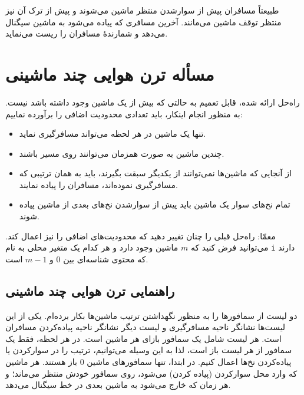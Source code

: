 \documentclass{book}
\newcommand{\clearemptydoublepage}{\newpage\cleardoublepage}
\begin{document}
    طبیعتاً مسافران پیش از سوارشدن منتظر ماشین می‌شوند و پیش از ترک آن نیز منتظر توقف ماشین می‌مانند. 
    آخرین مسافری که پیاده می‌شود به ماشین سیگنال می‌دهد و شمارندهٔ مسافران را ریست می‌نماید. 


\clearemptydoublepage
\section{مسأله ترن هوایی چند ماشینی}

    راه‌حل ارائه شده، قابل تعمیم به حالتی که بیش از یک ماشین وجود داشته باشد نیست. به منظور انجام اینکار، باید تعدادی محدودیت اضافی را برآورده نماییم:

\begin{itemize}

\item 
    تنها یک ماشین در هر لحظه می‌تواند مسافرگیری نماید.

\item 
    چندین ماشین به صورت همزمان می‌توانند روی مسیر باشند. 

\item 
    از آنجایی که ماشین‌ها نمی‌توانند از یکدیگر سبقت بگیرند، باید به همان ترتیبی که مسافرگیری نموده‌اند، مسافران را پیاده نمایند. 

\item 
    تمام نخ‌های سوار یک ماشین باید پیش از سوارشدن نخ‌های بعدی از ماشین پیاده شوند.
\end{itemize}

    معمّا: راه‌حل قبلی را چنان تغییر دهید که محدودیت‌های اضافی را نیز اعمال کند. 
    می‌توانید فرض کنید که  $m$ ماشین وجود دارد و هر کدام یک متغیر محلی به نام {\tt i} دارند که محتوی شناسه‌‌ای بین 0 و  $m-1$ است. 


\clearemptydoublepage
\subsection{راهنمایی ترن هوایی چند ماشینی}

    دو لیست از سمافورها را به منظور نگهداشتن ترتیب ماشین‌ها بکار برده‌ام. یکی از این لیست‌ها نشانگر ناحیه مسافرگیری و لیست دیگر 
    نشانگر ناحیه پیاده‌کردن مسافران است. هر لیست شامل یک سمافور بازای هر ماشین است. در هر لحظه، فقط یک سمافور از هر لیست باز است، 
    لذا به این وسیله می‌توانیم، ترتیب را در سوارکردن یا پیاده‌کردن نخ‌ها اعمال کنیم. در ابتدا، تنها سمافورهای ماشین $0$ باز هستند. 
    هر ماشین که وارد محل سوارکردن (پیاده کردن) می‌شود،‌ روی سمافور خودش منتظر می‌ماند؛ و هر زمان که خارج می‌شود به ماشین 
    بعدی در خط سیگنال می‌دهد. 
\end{document}
